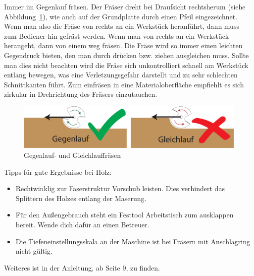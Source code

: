 \documentclass{\basedir/fablab-document}
\begin{document}
Immer im Gegenlauf fräsen. Der Fräser dreht bei Draufsicht rechtsherum (siehe Abbildung~\ref{gleichlauf-gegenlauf}), wie auch auf der Grundplatte durch einen Pfeil eingezeichnet. Wenn man also die Fräse von rechts an ein Werkstück heranführt, dann muss zum Bediener hin gefräst werden. Wenn man von rechts an ein Werkstück herangeht, dann von einem weg fräsen. Die Fräse wird so immer einen leichten Gegendruck bieten, den man durch drücken bzw. ziehen ausgleichen muss. Sollte man dies nicht beachten wird die Fräse sich unkontrolliert schnell am Werkstück entlang bewegen, was eine Verletzungsgefahr darstellt und zu sehr schlechten Schnittkanten führt. Zum einfräsen in eine Materialoberfläche empfiehlt es sich zirkular in Drehrichtung des Fräsers einzutauchen.

\begin{figure}[h!]
\centering
\includegraphics[width=\textwidth]{bilder/gleichlauf-gegenlauf}
\caption{Gegenlauf- und Gleichlauffräsen}
\label{gleichlauf-gegenlauf}
\end{figure}

Tipps für gute Ergebnisse bei Holz:
\begin{itemize}
    \item Rechtwinklig zur Faserstruktur Vorschub leisten. Dies verhindert das Splittern des Holzes entlang der Maserung.
    \item Für den Außengebrauch steht ein Festtool Arbeitstisch zum ausklappen bereit. Wende dich dafür an einen Betreuer.
    \item Die Tiefeneinstellungsskala an der Maschine ist bei Fräsern mit Anschlagring nicht gültig. 
\end{itemize}

Weiteres ist in der Anleitung, ab Seite 9, zu finden.
\end{document}
